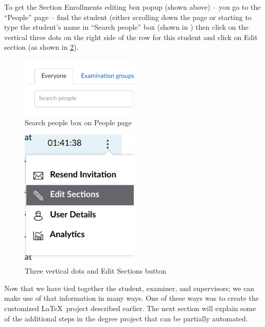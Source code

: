 To get the Section Enrollments editing box popup (shown above) – you go to the “People” page – find the student (either scrolling down the page or starting to type the student’s name in “Search people” box (shown in ) then click on the vertical three dots on the right side of the row for this student and click on Edit section (as shown in \cref{fig:editSectionsButton}).
\begin{figure}[!ht]
  \begin{center}
    \includegraphics[width=0.5\textwidth]{README_notes/README-examiner-figures/Search-people-Screenshot_20220325_161811.png}
  \end{center}
  \caption{Search people box on People page}
  \label{fig:peopleSearchbox}
\end{figure}
	
\begin{figure}[!ht]
  \begin{center}
    \includegraphics[width=0.5\textwidth]{README_notes/README-examiner-figures/edit-section-cmd-Screenshot_20220325_162252.png}
  \end{center}
  \caption{Three vertical dots and Edit Sections button}
  \label{fig:editSectionsButton}
\end{figure}
\FloatBarrier

Now that we have tied together the student, examiner, and supervisors; we can make use of that information in many ways. One of these ways was to create the customized \LaTeX~project described earlier. The next section will explain some of the additional steps in the degree project that can be partially automated.
